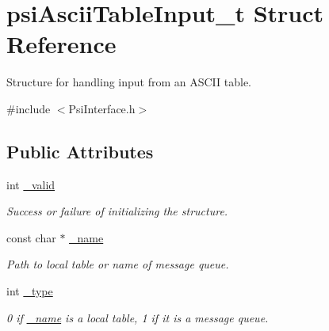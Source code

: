 \hypertarget{structpsiAsciiTableInput__t}{}\section{psi\+Ascii\+Table\+Input\+\_\+t Struct Reference}
\label{structpsiAsciiTableInput__t}


Structure for handling input from an A\+S\+C\+II table.  




{\ttfamily \#include $<$Psi\+Interface.\+h$>$}

\subsection*{Public Attributes}
\begin{DoxyCompactItemize}
\item 
\mbox{\label{structpsiAsciiTableInput__t_a017354004fcb6727848031898d572136}} 
int \hyperlink{structpsiAsciiTableInput__t_a017354004fcb6727848031898d572136}{\+\_\+valid}
\begin{DoxyCompactList}\small\item\em Success or failure of initializing the structure. \end{DoxyCompactList}\item 
\mbox{\label{structpsiAsciiTableInput__t_afd75b93efee18f35d9d14960254dcc0c}} 
const char $\ast$ \hyperlink{structpsiAsciiTableInput__t_afd75b93efee18f35d9d14960254dcc0c}{\+\_\+name}
\begin{DoxyCompactList}\small\item\em Path to local table or name of message queue. \end{DoxyCompactList}\item 
\mbox{\label{structpsiAsciiTableInput__t_a05fe77a32bb1f2457df4e190ae1e4dd7}} 
int \hyperlink{structpsiAsciiTableInput__t_a05fe77a32bb1f2457df4e190ae1e4dd7}{\+\_\+type}
\begin{DoxyCompactList}\small\item\em 0 if \hyperlink{structpsiAsciiTableInput__t_afd75b93efee18f35d9d14960254dcc0c}{\+\_\+name} is a local table, 1 if it is a message queue. \end{DoxyCompactList}\item 

\end{DoxyCompactItemize}
